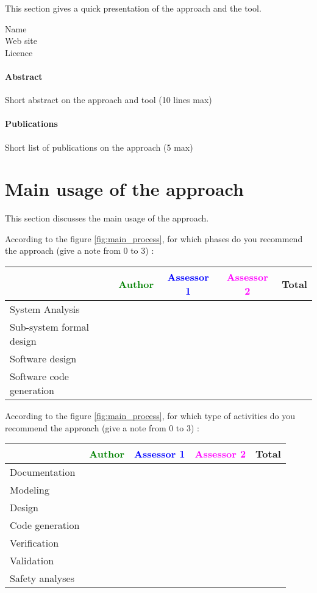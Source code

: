 This section gives a quick presentation of the approach and the tool.

\begin{description}
\item[Name] 
\item[Web site] 
\item[Licence] 
\end{description}

\paragraph{Abstract} Short abstract on the approach and tool (10 lines max)

\paragraph{Publications} Short list of publications on the approach (5 max)


\section{Main usage of the approach}
\label{main_usage}
This section discusses the main usage of the approach.

According to the figure \ref{fig:main_process}, for which phases do you recommend the approach (give a note from 0 to  3) :

\begin{tabular}{|l | c | c | c | c|}
\hline
& \textcolor{green}{Author} & \textcolor{blue}{Assessor 1} & \textcolor{magenta}{Assessor 2} & Total \\
\hline 
System Analysis & & & &  \\
\hline
Sub-system formal design & & & & \\
\hline
Software design & & & & \\
\hline
Software code generation & & & & \\
\hline
\end{tabular}

According to the figure \ref{fig:main_process}, for which type of activities do you recommend the approach (give a note from 0 to  3) :

\begin{tabular}{|l | c | c | c | c|}
\hline
& \textcolor{green}{Author} & \textcolor{blue}{Assessor 1} & \textcolor{magenta}{Assessor 2} & Total \\
\hline 
Documentation & & & &  \\
\hline
Modeling & & & &  \\
\hline
Design & & & & \\
\hline
Code generation & & & & \\
\hline
Verification & & & & \\
\hline
Validation & & & & \\
\hline
Safety analyses & & & & \\
\hline
\end{tabular}

